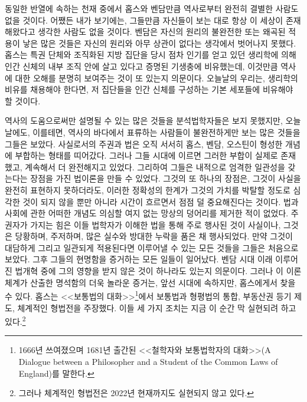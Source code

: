 동일한 반열에 속하는 천재 중에서
홉스와 벤담만큼 역사로부터 완전히 결별한 사람도 없을 것이다.
어쨌든 내가 보기에는,
그들만큼 자신들이 보는 대로 항상 이 세상이 존재해왔다고 생각한 사람도
없을 것이다.
벤담은 자신의 원리의 불완전한 또는 왜곡된 적용이 낳은 많은 것들은
자신의 원리와 아무 상관이 없다는 생각에서 벗어나지 못했다.
홉스는
특권 단체와 조직화된 지방 집단을
당시 점차 인기를 얻고 있던 생리학에 의해
인간 신체의 내부 조직 안에 살고 있다고 증명된
기생충에 비유했는데,
이것만큼 역사에 대한 오해를 분명히 보여주는 것이 또 있는지 의문이다.
오늘날의 우리는,
생리학의 비유를 채용해야 한다면,
저 집단들을
인간 신체를 구성하는 기본 세포들에
비유해야 할 것이다.

역사의 도움으로써만 설명될 수 있는 많은 것들을
분석법학자들은 보지 못했지만,
오늘날에도,
이를테면,
역사의 바다에서 표류하는 사람들이
불완전하게만 보는 많은 것들을
그들은 보았다.
사실로서의 주권과 법은 오직 서서히
홉스, 벤담, 오스틴이 형성한 개념에 부합하는 형태를 띠어갔다.
그러나 그들 시대에 이르면 그러한 부합이 실제로 존재했고,
계속해서 더 완전해지고 있었다.
그리하여 그들은
내적으로 엄격한 일관성을 갖는다는 장점을 가진 법이론을 만들 수 있었다.
그것의 또 하나의 장점은,
그것이 사실을 완전히 표현하지 못하더라도,
이러한 정확성의 한계가 그것의 가치를 박탈할 정도로
심각한 것이 되지 않을 뿐만 아니라
시간이 흐르면서 점점 덜 중요해진다는 것이다.
법과 사회에 관한 어떠한 개념도
의심할 여지 없는 망상의 덩어리를 제거한 적이 없었다.
주권자가 가지는 힘은 이들 법학자가 이해한 법을 통해 주로 행사된 것이 사실이나,
그것은 당황하며, 주저하며, 많은 실수와 방대한 누락을 품은 채 행사되었다.
만약 그것이 대담하게 그리고 일관되게 적용된다면
이루어낼 수 있는 모든 것들을
그들은 처음으로 보았다.
그후 그들의 현명함을 증거하는 모든 일들이 일어났다.
벤담 시대 이래 이루어진 법개혁 중에 그의 영향을 받지 않은 것이 하나라도 있는지
의문이다.
그러나 이 이론체계가 산출한
명석함의 더욱 놀라운 증거는, 앞선 시대에 속하지만, 홉스에게서 찾을 수 있다.
홉스는 <<보통법의 대화>>\footnote{%
  1666년 쓰여졌으며 1681년 출간된
  <<철학자와 보통법학자의 대화>>(A Dialogue between
  a Philosopher and a Student of the Common Laws of England)를 말한다.
}에서
보통법과 형평법의 통합, 부동산권 등기 제도, 체계적인 형법전을 주장했다.
이들 세 가지 조치는 지금 이 순간 막 실현되려 하고 있다.\footnote{%
  그러나 체계적인 형법전은 2022년 현재까지도 실현되지 않고 있다. }

